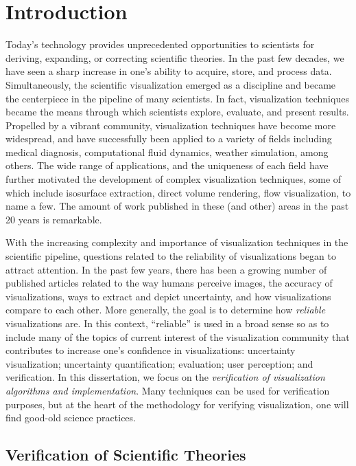 \chapter{Introduction}

Today's technology provides unprecedented opportunities to scientists for deriving, expanding, or correcting scientific theories. In the past few decades, we have seen a sharp increase in one's ability to acquire, store, and process data. Simultaneously, the scientific visualization emerged as a discipline and became the centerpiece in the pipeline of many scientists. In fact, visualization techniques became the means through which scientists explore, evaluate, and present results. 
%
Propelled by a vibrant community, visualization techniques have become more widespread, and have successfully been applied to a variety of fields including medical diagnosis, computational fluid dynamics, weather simulation, among others. The wide range of applications, and the uniqueness of each field have further motivated the development of complex visualization techniques, some of which include isosurface extraction, direct volume rendering, flow visualization, to name a few.  
The amount of work published in these (and other) areas in the past 20 years is remarkable. 

With the increasing complexity and importance of visualization techniques in the scientific pipeline, questions related to the reliability of visualizations began to attract attention. In the past few years, there has been a growing number of published  articles related to the way humans perceive images, the accuracy of visualizations, ways to extract and depict uncertainty, and how visualizations compare to each other. More generally, the goal is to determine how \emph{reliable} visualizations are.
%
In this context, ``reliable'' is used in a broad sense so as to include many of the topics of current interest of the visualization community that contributes to increase one's confidence in visualizations: uncertainty visualization; uncertainty quantification; evaluation; user perception; and verification.
%
In this dissertation, we focus on the \emph{verification of visualization algorithms and implementation}.  
Many techniques can be used for verification purposes, but at the heart of the methodology for verifying visualization, one will find good-old science practices. 
	
\section{Verification of Scientific Theories}

